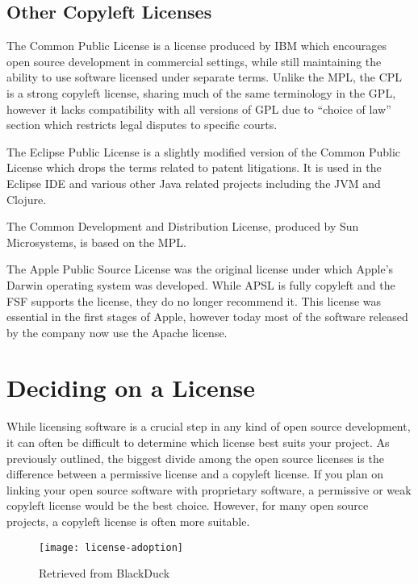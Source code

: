 \documentclass[12pt,letterpaper]{article}
\begin{document}
\subsection{Other Copyleft Licenses}

The Common Public License is a license produced by IBM which encourages open source development in commercial settings, while still maintaining the ability to use software licensed under separate terms. Unlike the MPL, the CPL is a strong copyleft license, sharing much of the same terminology in the GPL, however it lacks compatibility with all versions of GPL due to ``choice of law'' section which restricts legal disputes to specific courts.

The Eclipse Public License is a slightly modified version of the Common Public License which drops the terms related to patent litigations. It is used in the Eclipse IDE and various other Java related projects including the JVM and Clojure.

The Common Development and Distribution License, produced by Sun Microsystems, is based on the MPL.

The Apple Public Source License was the original license under which Apple's Darwin operating system was developed. While APSL is fully copyleft and the FSF supports the license, they do no longer recommend it. This license was essential in the first stages of Apple, however today most of the software released by the company now use the Apache license.

\newpage

\section{Deciding on a License}

While licensing software is a crucial step in any kind of open source development, it can often be difficult to determine which license best suits your project. As previously outlined, the biggest divide among the open source licenses is the difference between a permissive license and a copyleft license. If you plan on linking your open source software with proprietary software, a permissive or weak copyleft license would be the best choice. However, for many  open source projects, a copyleft license is often more suitable.


\begin{figure}[h]
\begin{adjustwidth}{-1in}{-1in}
  \centering
  \texttt{[image: license-adoption]}
\end{adjustwidth}
  \caption[Top 20 Open Source Licenses]{Retrieved from BlackDuck \cite{license-stats}}
\end{figure}
\end{document}
